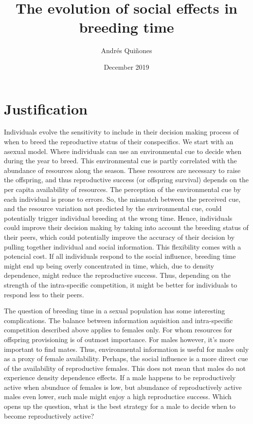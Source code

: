 \documentclass{article}
\begin{document}
	
	\title{The evolution of social effects in breeding time} \author{Andr\'es Qui\~nones} \date{December 2019}
	\maketitle
	
	\section{Justification}
	 
	 Individuals evolve the sensitivity to include in their decision making process of 
	 when to breed the reproductive status of their conspecifics. We start with an asexual
	 model. Where individuals can use an environmental cue to decide when during the year 
	 to breed. This environmental cue is partly correlated with the abundance of 
	 resources along the season. These resources are necessary to raise the offspring, 
	 and thus reproductive success (or offspring survival) depends on the per capita 
	 availability of resources. The perception of the environmental cue by each individual 
	 is prone to errors. So, the mismatch between the perceived cue, and the resource 
	 variation not predicted by the environmental cue, could potentially trigger individual
	 breeding at the wrong time. Hence, individuals could improve their decision making by 
	 taking into account the breeding status of their peers, which could potentially 
	 improve the accuracy of their decision by pulling together individual and social information. 
	 This flexibility comes with a potencial cost.  If all individuals respond to the social influence, breeding time might end up being overly concentrated in time, which, due to density dependence, might reduce the reproductive success. Thus, depending on the strength of the intra-specific competition,
	 it might be better for individuals to respond less to their peers. 
	 
	 The question of breeding time in a sexual population has some interesting complications.
	 The balance between information aquisition and intra-specific competition described
	 above applies to females only. For whom resources for offspring provisioning is of 
	 outmost importance. For males however, it's more important to find mates. Thus, 
	 environmental information is useful for males only as a proxy of female availability. 
	 Perhaps, the social influence is a more direct cue of the availability of reproductive 
	 females. This does not mean that males do not experience density dependence effects. 
	 If a male happens to be reproductively active when abunduce of females is low, but 
	 abundance of reproductively active males even lower, such male might enjoy a high 
	 reproductice success. Which opens up the question, what is the best strategy for a 
	 male to decide when to become reproductively active?
	 
\end{document}
